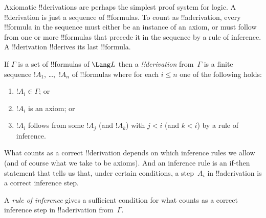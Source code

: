 \documentclass[../../../include/open-logic-section]{subfiles}
\begin{document}
      {}
      {}


\begin{explain}
  Axiomatic !!{derivation}s are perhaps the simplest proof system for
  logic. A !!{derivation} is just a sequence of !!{formula}s.  To
  count as !!a{derivation}, every !!{formula} in the sequence must
  either be an instance of an axiom, or must follow from one or more
  !!{formula}s that precede it in the sequence by a rule of inference.
  A !!{derivation} !!{derive}s its last !!{formula}.
\end{explain}

\begin{defn}[!!^{derivability}]
If $\Gamma$ is a set of !!{formula}s of $\Lang L$ then a
\emph{!!{derivation}} from~$\Gamma$ is a finite sequence $!A_1$,
\dots,~$!A_n$ of !!{formula}s where for each $i \le n$ one of the
following holds:
\begin{enumerate}
\item $!A_i \in \Gamma$; or
\item $!A_i$ is an axiom; or
\item $!A_i$ follows from some $!A_j$ (and $!A_k$) with $j < i$ (and
  $k < i$) by a rule of inference.
\end{enumerate}
\end{defn}

What counts as a correct !!{derivation} depends on which inference
rules we allow (and of course what we take to be axioms).  And an
inference rule is an if-then statement that tells us that, under
certain conditions, a step~$A_i$ in !!a{derivation} is a correct
inference step.

\begin{defn}
A \emph{rule of inference} gives a sufficient condition for what
counts as a correct inference step in !!a{derivation} from~$\Gamma$.
\end{defn}
\end{document}
